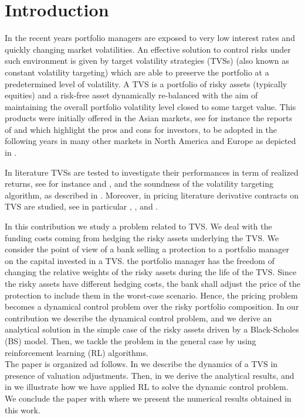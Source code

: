 \documentclass[11pt]{article}
\begin{document}
\section{Introduction}
In the recent years portfolio managers are exposed to very low interest rates and quickly changing market volatilities. An effective solution to control risks under such environment is given by target volatility strategies (TVSs) (also known as constant volatility targeting) which are able to preserve the portfolio at a predetermined level of volatility. A TVS is  a  portfolio  of  risky  assets  (typically  equities)  and  a  risk-free  asset dynamically re-balanced with the aim of maintaining the overall portfolio volatility level closed to some target value. This products were initially offered in the Asian markets, see for instance the reports of \textcite{Chew} and \textcite{XUE} which highlight the pros and cons for investors, to be adopted in the following years in many other markets in North America and Europe as depicted in \textcite{Morrison}.

In literature TVSs are tested to investigate their performances in term of realized returns, see for instance \textcite{Hocquard28} and \textcite{PERCHET}, and the soundness of the volatility targeting algorithm, as described in \textcite{Kim}. Moreover, in pricing literature derivative contracts on TVS are studied, see in particular \textcite{Di_Graziano}, \textcite{Grasselli}, and \textcite{Albeverio}. 

In this contribution we study a problem related to TVS. We deal with the funding costs coming from hedging the risky assets underlying the TVS. We consider the point of view of a bank selling a protection to a portfolio manager on the capital invested in a TVS. the portfolio manager has the freedom of changing the relative weights of the risky assets during the life of the TVS. Since the risky assets have different hedging costs, the bank shall adjust the price of the protection to include them in the worst-case scenario. Hence, the pricing problem becomes a dynamical control problem over the risky portfolio composition. In our contribution we describe the dynamical control problem, and we derive an analytical solution in the simple case of the risky assets driven by a Black-Scholes (BS) model. Then, we tackle the problem in the general case by using reinforcement learning (RL) algorithms.
\\

The paper is organized ad follows. In  we describe the dynamics of a TVS in presence of valuation adjustments. Then, in  we derive the analytical results, and in  we illustrate how we have applied RL to solve the dynamic control problem. We conclude the paper with  where we present the numerical results obtained in this work.
\end{document}
